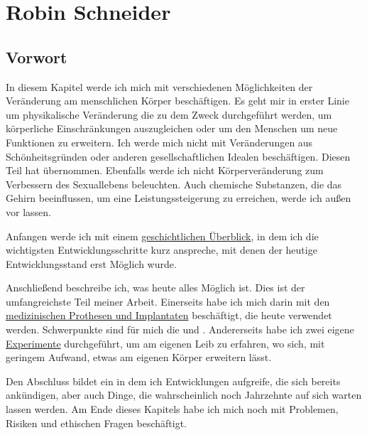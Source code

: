 \chapter{Robin Schneider}
\label{sec:Robin_Schneider}


\section{Vorwort}
In diesem Kapitel werde ich mich mit verschiedenen Möglichkeiten der Veränderung am menschlichen Körper beschäftigen.
Es geht mir in erster Linie um physikalische Veränderung die zu dem Zweck durchgeführt werden,
um körperliche Einschränkungen auszugleichen oder um den Menschen um neue Funktionen zu erweitern.
Ich werde mich nicht mit Veränderungen aus Schönheitsgründen
oder anderen gesellschaftlichen Idealen beschäftigen.
Diesen Teil hat  übernommen.
Ebenfalls werde ich nicht Körperveränderung zum Verbessern des Sexuallebens beleuchten.
Auch chemische Substanzen, die das Gehirn beeinflussen,
um eine Leistungssteigerung zu erreichen, werde ich außen vor lassen.


\bigskip
Anfangen werde ich mit einem \hyperref[sec:Robin:historical_overview]{geschichtlichen Überblick},
in dem ich die wichtigsten Entwicklungsschritte kurz anspreche, mit denen der heutige
Entwicklungsstand erst Möglich wurde.

Anschließend beschreibe ich, was heute alles Möglich ist.
Dies ist der umfangreichste Teil meiner Arbeit. Einerseits habe ich mich darin mit den
\hyperref[sec:Robin:topical]{medizinischen Prothesen und Implantaten} beschäftigt, die heute
verwendet werden. Schwerpunkte sind für mich die
 und .
Andererseits habe ich zwei eigene \hyperref[sec:Robin:experiments]{Experimente} durchgeführt, um am
eigenen Leib zu erfahren, wo sich, mit geringem Aufwand, etwas am eigenen Körper erweitern lässt.

Den Abschluss bildet ein  in dem ich Entwicklungen aufgreife, die sich
bereits ankündigen, aber auch Dinge, die wahrscheinlich noch Jahrzehnte auf sich warten lassen
werden. Am Ende dieses Kapitels habe ich mich noch mit Problemen, Risiken und ethischen
Fragen beschäftigt.











\nocite{
	Spektrum:Weg_zu_intelligenten_Prothesen,
	thesis:Cyborg,
	Stern:pacemaker,
	Heise:Telepolis:Mensch:Cyborg,
}



\printbibliography[heading=source,keyword=Robin]
